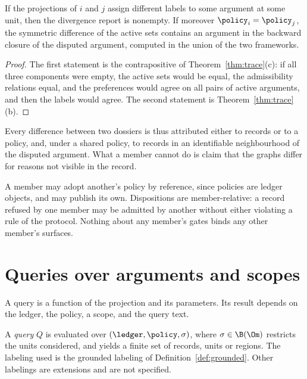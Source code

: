 \begin{proposition}\label{prop:divexplain}
If the projections of $i$ and $j$ assign different labels to some argument at some unit, then the divergence report is nonempty. If moreover $\policy_i=\policy_j$, the symmetric difference of the active sets contains an argument in the backward closure of the disputed argument, computed in the union of the two frameworks.
\end{proposition}

\begin{proof}
The first statement is the contrapositive of Theorem~\ref{thm:trace}(c): if all three components were empty, the active sets would be equal, the admissibility relations equal, and the preferences would agree on all pairs of active arguments, and then the labels would agree. The second statement is Theorem~\ref{thm:trace}(b).
\end{proof}

Every difference between two dossiers is thus attributed either to records or to a policy, and, under a shared policy, to records in an identifiable neighbourhood of the disputed argument. What a member cannot do is claim that the graphs differ for reasons not visible in the record.

A member may adopt another's policy by reference, since policies are ledger objects, and may publish its own. Dispositions are member-relative: a record refused by one member may be admitted by another without either violating a rule of the protocol. Nothing about any member's gates binds any other member's surfaces.

\section{Queries over arguments and scopes}\label{sec:queries}

A query is a function of the projection and its parameters. Its result depends on the ledger, the policy, a scope, and the query text.

\begin{definition}\label{def:query}
A \emph{query} $Q$ is evaluated over $(\ledger,\policy,\sigma)$, where $\sigma\in\B(\Om)$ restricts the units considered, and yields a finite set of records, units or regions. The labeling used is the grounded labeling of Definition~\ref{def:grounded}. Other labelings are extensions and are not specified.
\end{definition}

